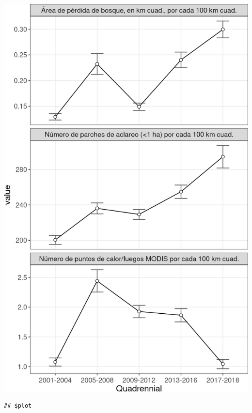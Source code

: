 \documentclass[10pt,landscape,a3paper]{article}
\begin{document}
\begin{center}\includegraphics{img/modelling/aa-eda-ts-14} \end{center}

\begin{verbatim}
## $plot
\end{verbatim}
\end{document}
